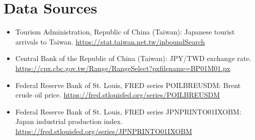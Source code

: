 \documentclass[12pt]{article}
\begin{document}
\section*{Data Sources}

\begingroup
\sloppy
\begin{itemize}
\item Tourism Administration, Republic of China (Taiwan): Japanese tourist arrivals to Taiwan. \url{https://stat.taiwan.net.tw/inboundSearch}
\item Central Bank of the Republic of China (Taiwan): JPY/TWD exchange rate. \url{https://cpx.cbc.gov.tw/Range/RangeSelect?pxfilename=BP01M01.px}
\item Federal Reserve Bank of St. Louis, FRED series POILBREUSDM: Brent crude oil price. \url{https://fred.stlouisfed.org/series/POILBREUSDM}
\item Federal Reserve Bank of St. Louis, FRED series JPNPRINTO01IXOBM: Japan industrial production index. \url{https://fred.stlouisfed.org/series/JPNPRINTO01IXOBM}
\end{itemize}
\endgroup
\end{document}
